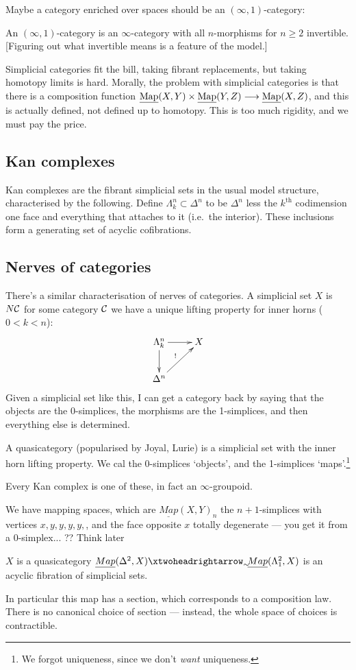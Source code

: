 \begin{SaulInftyOneCats}
Maybe a category enriched over spaces should be an $(\infty,1)$-category:
\begin{defn*}
An $(\infty,1)$-category is an $\infty$-category with all $n$-morphisms for $n\geq2$ invertible. [Figuring out what invertible means is a feature of the model.]
\end{defn*}
Simplicial categories fit the bill, taking fibrant replacements, but taking homotopy limits is hard. Morally, the problem with simplicial categories is that there is a composition function $\underline{\operatorname{Map}}(X,Y)\times\underline{\operatorname{Map}}(Y,Z)\longrightarrow\underline{\operatorname{Map}}(X,Z)$, and this is actually defined, not defined up to homotopy. This is too much rigidity, and we must pay the price.
\subsection*{Kan complexes}
Kan complexes are the fibrant simplicial sets in the usual model structure, characterised by the following. Define $\Lambda^n_k\subset \Delta^n$ to be $\Delta^n$ less the $k^\text{th}$ codimension one face and everything that attaches to it (i.e.\ the interior). These inclusions form a generating set of acyclic cofibrations.
\subsection*{Nerves of categories}
There's a similar characterisation of nerves of categories. A simplicial set $X$ is $N\mathcal{C}$ for some category $\mathcal{C}$ \Iff we have a unique lifting property for inner horns ($0<k<n$):
\[\xymatrix{
\Lambda^n_k\ar[d]\ar[r]& X\\
\Delta^n\ar[ur]^{!}
}\]
Given a simplicial set like this, I can get a category back by saying that the objects are the 0-simplices, the morphisms are the 1-simplices, and then everything else is determined.
\begin{defn*}
A quasicategory (popularised by Joyal, Lurie) is a simplicial set with the inner horn lifting property. We cal the 0-simplices `objects', and the 1-simplices `maps'.\footnote{We forgot uniqueness, since we don't \emph{want} uniqueness.}

\end{defn*}
\noindent Every Kan complex is one of these, in fact an $\infty$-groupoid.

We have mapping spaces, which are $\underline{Map}(X,Y)_n$ the $n+1$-simplices with vertices $x,y,y,y,y,$, and the face opposite $x$ totally degenerate --- you get it from a 0-simplex... ?? Think later
\begin{thm*}[Joyal]
$X$ is a quasicategory \Iff $\underline{Map}(\Delta^2,X)\acyclicfibration\underline{Map}(\Lambda^2_1,X)$ is an acyclic fibration of simplicial sets.
\end{thm*}
\noindent In particular this map has a section, which corresponds to a composition law. There is no canonical choice of section --- instead, the whole space of choices is contractible.


\end{SaulInftyOneCats}
